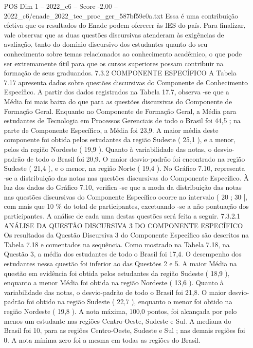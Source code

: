 \begin{textsample}{POS Dim 1 – 2022\_c6 – Score -2.00 – 2022\_c6/enade\_2022\_tec\_proc\_ger\_587bf59e0a.txt}
Essa é uma contribuição efetiva que os resultados do Enade podem oferecer às IES do país.
Para finalizar, vale observar que as duas questões discursivas atenderam às exigências de avaliação, tanto do domínio discursivo dos estudantes quanto do seu conhecimento sobre temas relacionados ao conhecimento acadêmico, o que pode ser extremamente útil para que os cursos superiores possam contribuir na formação de seus graduandos. 7.3.2 COMPONENTE ESPECÍFICO A Tabela 7.17 apresenta dados sobre questões discursivas do Componente de Conhecimento Específico.
A partir dos dados registrados na Tabela 17.7, observa -se que a Média foi mais baixa do que para as questões discursivas do Componente de Formação Geral.
Enquanto no Componente de Formação Geral, a Média para estudantes de Tecnologia em Processos Gerenciais de todo o Brasil foi 44,5 ; na parte de Componente Específico, a Média foi 23,9.
A maior média deste componente foi obtida pelos estudantes da região Sudeste ( 25,1 ), e a menor, pelos da região Nordeste ( 19,9 ).
Quanto à variabilidade das notas, o desvio-padrão de todo o Brasil foi 20,9.
O maior desvio-padrão foi encontrado na região Sudeste ( 21,4 ), e o menor, na região Norte ( 19,4 ).
No Gráfico 7.10, representa -se a distribuição das notas nas questões discursivas do Componente Específico.
À luz dos dados do Gráfico 7.10, verifica -se que a moda da distribuição das notas nas questões discursivas do Componente Específico ocorre no intervalo ( 20 ; 30 ], com mais que 10 \% do total de participantes, excetuando -se a não pontuação dos participantes.
A análise de cada uma destas questões será feita a seguir. 7.3.2.1 ANÁLISE DA QUESTÃO DISCURSIVA 3 DO COMPONENTE ESPECÍFICO Os resultados da Questão Discursiva 3 do Componente Específico são descritos na Tabela 7.18 e comentados na sequência.
Como mostrado na Tabela 7.18, na Questão 3, a média dos estudantes de todo o Brasil foi 17,4.
O desempenho dos estudantes nessa questão foi inferior ao das Questões 2 e 5.
A maior Média na questão em evidência foi obtida pelos estudantes da região Sudeste ( 18,9 ), enquanto a menor Média foi obtida na região Nordeste ( 13,6 ).
Quanto à variabilidade das notas, o desvio-padrão de todo o Brasil foi 21,8.
O maior desvio-padrão foi obtido na região Sudeste ( 22,7 ), enquanto o menor foi obtido na região Nordeste ( 19,8 ).
A nota máxima, 100,0 pontos, foi alcançada por pelo menos um estudante nas regiões Centro-Oeste, Sudeste e Sul.
A mediana do Brasil foi 10, para as regiões Centro-Oeste, Sudeste e Sul ; nas demais regiões foi 0.
A nota mínima zero foi a mesma em todas as regiões do Brasil.

\end{textsample}
